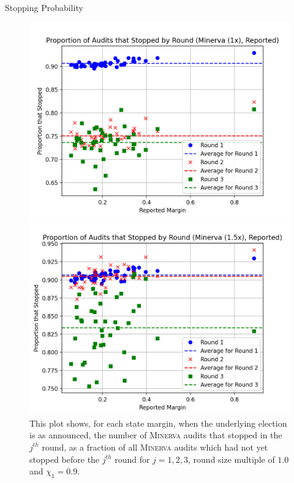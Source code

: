 \documentclass[final]{beamer}
\newcommand{\Minerva}{\textsc{Minerva}\xspace}
\newlength{\colwidth}
\begin{document}
\begin{frame}[t]
\begin{columns}[t]
\begin{column}{\colwidth}
\begin{block}{Stopping Probability}
\begin{figure}[h]
\begin{minipage}{.49\textwidth}
\begin{centering}
\includegraphics[width=1\textwidth]{minerva_multiround_1x_10^4/sprobs_first_three.png}
\caption{This plot shows, for each state margin, when the underlying election is as announced, the number of \Minerva audits that stopped in the $j^{th}$ round,
as a fraction of all \Minerva audits which had not yet stopped before the $j^{th}$ round for $j=1,2,3$, round size multiple of $1.0$ and $\chi_1=0.9$.}
\label{fig:minerva1_sprob}
\end{centering}
\end{minipage}
\begin{minipage}{.49\textwidth}
\begin{centering}
\includegraphics[width=1\textwidth]{minerva_multiround_1p5x_10^4/sprobs_first_three.png}

\end{centering}
\end{minipage}
\end{figure}
\end{block}
\end{column}
\end{columns}
\end{frame}
\end{document}
